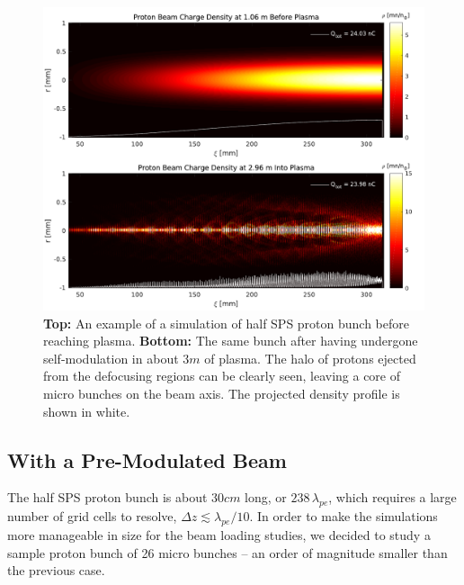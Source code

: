 \begin{figure}[hbt]
    \centering
    \includegraphics[width=1.0\linewidth]{figures/PBSelfModulationBefAft}
    \caption{\label{Fig:Sim:SMI}
        \textbf{Top:} An example of a simulation of half SPS proton bunch before reaching plasma.
        \textbf{Bottom:} The same bunch after having undergone self-modulation in about $3\unit{m}$ of plasma.
        The halo of protons ejected from the defocusing regions can be clearly seen, leaving a core of micro bunches on the beam axis.
        The projected density profile is shown in white.
    }
\end{figure}


\subsection{With a Pre-Modulated Beam}
\label{Sim:PBPreMod}

The half SPS proton bunch is about $30\unit{cm}$ long, or $238\,\lambda_{pe}$, which requires a large number of grid cells to resolve, $\Delta z \lesssim \lambda_{pe}/10$.
In order to make the simulations more manageable in size for the beam loading studies, we decided to study a sample proton bunch of 26 micro bunches -- an order of magnitude smaller than the previous case.

